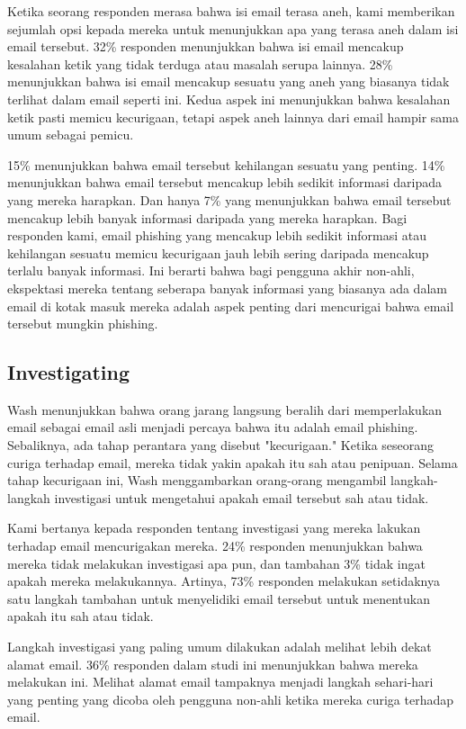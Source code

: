 \documentclass[lettersize,journal]{IEEEtran}
\begin{document}
Ketika seorang responden merasa bahwa isi email terasa aneh, kami memberikan
sejumlah opsi kepada mereka untuk menunjukkan apa yang terasa aneh dalam isi
email tersebut. 32\% responden menunjukkan bahwa isi email mencakup kesalahan
ketik yang tidak terduga atau masalah serupa lainnya. 28\% menunjukkan bahwa
isi email mencakup sesuatu yang aneh yang biasanya tidak terlihat dalam email
seperti ini. Kedua aspek ini menunjukkan bahwa kesalahan ketik pasti memicu
kecurigaan, tetapi aspek aneh lainnya dari email hampir sama umum sebagai
pemicu.

15\% menunjukkan bahwa email tersebut kehilangan sesuatu yang penting. 14\% menunjukkan bahwa email tersebut mencakup lebih sedikit informasi daripada yang mereka harapkan. Dan hanya 7\% yang menunjukkan bahwa email tersebut mencakup lebih banyak informasi daripada yang mereka harapkan. Bagi responden kami, email phishing yang mencakup lebih sedikit informasi atau kehilangan sesuatu memicu kecurigaan jauh lebih sering daripada mencakup terlalu banyak informasi. Ini berarti bahwa bagi pengguna akhir non-ahli, ekspektasi mereka tentang seberapa banyak informasi yang biasanya ada dalam email di kotak masuk mereka adalah aspek penting dari mencurigai bahwa email tersebut mungkin phishing.

\subsection{Investigating}

Wash \cite{tigaempat} menunjukkan bahwa orang jarang langsung beralih dari
memperlakukan email sebagai email asli menjadi percaya bahwa itu adalah email
phishing. Sebaliknya, ada tahap perantara yang disebut "kecurigaan." Ketika
seseorang curiga terhadap email, mereka tidak yakin apakah itu sah atau
penipuan. Selama tahap kecurigaan ini, Wash \cite{tigaempat} menggambarkan
orang-orang mengambil langkah-langkah investigasi untuk mengetahui apakah email
tersebut sah atau tidak.

Kami bertanya kepada responden tentang investigasi yang mereka lakukan terhadap
email mencurigakan mereka. 24\% responden menunjukkan bahwa mereka tidak
melakukan investigasi apa pun, dan tambahan 3\% tidak ingat apakah mereka
melakukannya. Artinya, 73\% responden melakukan setidaknya satu langkah
tambahan untuk menyelidiki email tersebut untuk menentukan apakah itu sah atau
tidak.

Langkah investigasi yang paling umum dilakukan adalah melihat lebih dekat
alamat email. 36\% responden dalam studi ini menunjukkan bahwa mereka melakukan
ini. Melihat alamat email tampaknya menjadi langkah sehari-hari yang penting
yang dicoba oleh pengguna non-ahli ketika mereka curiga terhadap email.
\end{document}
